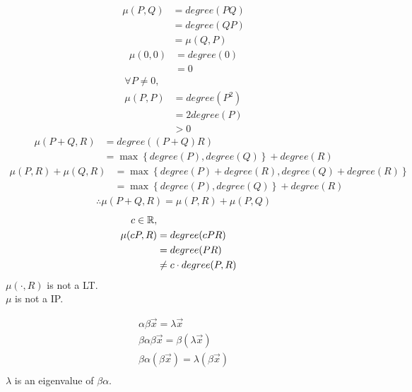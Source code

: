 \documentclass{mathtoolkit}
\begin{document}
\begin{p}
  \item
    \begin{align*}
      \mu(P, Q) & = degree(PQ) \\
                & = degree(QP) \\
                & = \mu(Q, P)
    \end{align*}
    \begin{align*}
      \mu(0, 0) & = degree(0) \\
                & = 0
    \end{align*}
    \begin{align*}
      \forall P \ne 0, \\
      \mu(P, P) & = degree(P^2) \\
                & = 2 degree(P) \\
                & > 0
    \end{align*}
    \begin{align*}
      \mu(P + Q, R) & = degree((P + Q) R) \\
                    & = \max \left\{ degree(P), degree(Q) \right\} + degree(R)
    \end{align*}
    \begin{align*}
      \mu(P, R) + \mu(Q, R) & = \max \left\{ degree(P) + degree(R), degree(Q) + degree(R) \right\} \\
                            & = \max \left\{ degree(P), degree(Q) \right\} + degree(R)
    \end{align*}
    \begin{gather*}
      \therefore \mu(P + Q, R) = \mu(P, R) + \mu(P, Q)
    \end{gather*}
    \begin{align*}
      c \in \mathbb{R}, \\
      \mu(cP, R) & = degree(cPR) \\
                 & = degree(PR) \\
                 & \ne c \cdot degree(P, R)
    \end{align*}
    \therefore $\mu(\cdot, R)$ is not a LT. \\
    \therefore $\mu$ is not a IP.

  \item
    \begin{gather*}
      \alpha \beta \vec{x} = \lambda \vec{x} \\
      \beta \alpha \beta \vec{x} = \beta (\lambda \vec{x}) \\
      \beta \alpha (\beta \vec{x}) = \lambda (\beta \vec{x}) \\
    \end{gather*}
    \therefore $\lambda$ is an eigenvalue of $\beta \alpha$.


\end{p}
\end{document}
